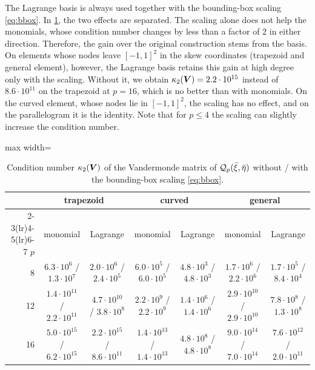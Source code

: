 The Lagrange basis is always used together with the bounding-box scaling \cref{eq:bbox}. In \cref{tab:scaling}, the two effects are separated. The scaling alone does not help the monomials, whose condition number changes by less than a factor of 2 in either direction. Therefore, the gain over the original construction stems from the basis. On elements whose nodes leave $[-1,1]^2$ in the skew coordinates (trapezoid and general element), however, the Lagrange basis retains this gain at high degree only with the scaling. Without it, we obtain $\kappa_2(\bm{V})=2.2\cdot10^{15}$ instead of $8.6\cdot10^{11}$ on the trapezoid at $p=16$, which is no better than with monomials. On the curved element, whose nodes lie in $[-1,1]^2$, the scaling has no effect, and on the parallelogram it is the identity. Note that for $p\le4$ the scaling can slightly increase the condition number.

\begin{table}[htbp]
  \centering\small
  \caption{Condition number $\kappa_2(\bm{V})$ of the Vandermonde matrix of $\mathcal Q_p(\bar\xi,\bar\eta)$ without / with the bounding-box scaling \cref{eq:bbox}.}
  \label{tab:scaling}
  \begin{adjustbox}{max width=\linewidth}
  \begin{tabular}{@{}rcccccc@{}}
    \toprule
    & \multicolumn{2}{c}{trapezoid} & \multicolumn{2}{c}{curved} & \multicolumn{2}{c}{general}\\
    \cmidrule(lr){2-3}\cmidrule(lr){4-5}\cmidrule(lr){6-7}
    $p$ & monomial & Lagrange & monomial & Lagrange & monomial & Lagrange \\
    \midrule
    8  & $6.3\cdot10^{6}$ / $1.3\cdot10^{7}$ & $2.0\cdot10^{6}$ / $2.4\cdot10^{5}$ & $6.0\cdot10^{5}$ / $6.0\cdot10^{5}$ & $4.8\cdot10^{3}$ / $4.8\cdot10^{3}$ & $1.7\cdot10^{6}$ / $2.2\cdot10^{6}$ & $1.7\cdot10^{5}$ / $8.4\cdot10^{4}$ \\
    12 & $1.4\cdot10^{11}$ / $2.2\cdot10^{11}$ & $4.7\cdot10^{10}$ / $3.8\cdot10^{8}$ & $2.2\cdot10^{9}$ / $2.2\cdot10^{9}$ & $1.4\cdot10^{6}$ / $1.4\cdot10^{6}$ & $2.9\cdot10^{10}$ / $2.9\cdot10^{10}$ & $7.8\cdot10^{8}$ / $1.3\cdot10^{8}$ \\
    16 & $5.0\cdot10^{15}$ / $6.2\cdot10^{15}$ & $2.2\cdot10^{15}$ / $8.6\cdot10^{11}$ & $1.4\cdot10^{13}$ / $1.4\cdot10^{13}$ & $4.8\cdot10^{8}$ / $4.8\cdot10^{8}$ & $9.0\cdot10^{14}$ / $7.0\cdot10^{14}$ & $7.6\cdot10^{12}$ / $2.0\cdot10^{11}$ \\
    \bottomrule
  \end{tabular}
  \end{adjustbox}
\end{table}
%
